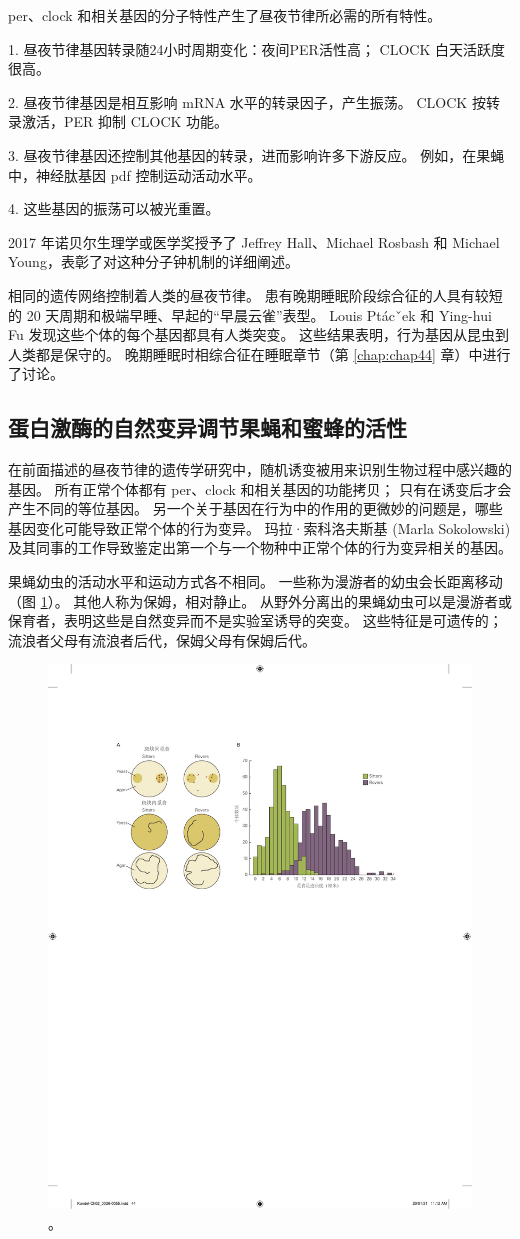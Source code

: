 per、clock 和相关基因的分子特性产生了昼夜节律所必需的所有特性。

1. 昼夜节律基因转录随24小时周期变化：夜间PER活性高； CLOCK 白天活跃度很高。

2. 昼夜节律基因是相互影响 mRNA 水平的转录因子，产生振荡。 CLOCK 按转录激活，PER 抑制 CLOCK 功能。

3. 昼夜节律基因还控制其他基因的转录，进而影响许多下游反应。 例如，在果蝇中，神经肽基因 pdf 控制运动活动水平。

4. 这些基因的振荡可以被光重置。

2017 年诺贝尔生理学或医学奖授予了 Jeffrey Hall、Michael Rosbash 和 Michael Young，表彰了对这种分子钟机制的详细阐述。

相同的遗传网络控制着人类的昼夜节律。 
患有晚期睡眠阶段综合征的人具有较短的 20 天周期和极端早睡、早起的“早晨云雀”表型。 
Louis Ptácˇek 和 Ying-hui Fu 发现这些个体的每个基因都具有人类突变。 
这些结果表明，行为基因从昆虫到人类都是保守的。 
晚期睡眠时相综合征在睡眠章节（第 \ref{chap:chap44} 章）中进行了讨论。


\subsection{蛋白激酶的自然变异调节果蝇和蜜蜂的活性}
在前面描述的昼夜节律的遗传学研究中，随机诱变被用来识别生物过程中感兴趣的基因。 
所有正常个体都有 per、clock 和相关基因的功能拷贝； 只有在诱变后才会产生不同的等位基因。 
另一个关于基因在行为中的作用的更微妙的问题是，哪些基因变化可能导致正常个体的行为变异。 
玛拉·索科洛夫斯基 (Marla Sokolowski) 及其同事的工作导致鉴定出第一个与一个物种中正常个体的行为变异相关的基因。


果蝇幼虫的活动水平和运动方式各不相同。 
一些称为漫游者的幼虫会长距离移动（图 \ref{fig:2_14}）。 
其他人称为保姆，相对静止。 
从野外分离出的果蝇幼虫可以是漫游者或保育者，表明这些是自然变异而不是实验室诱导的突变。 
这些特征是可遗传的； 流浪者父母有流浪者后代，保姆父母有保姆后代。

\begin{figure}[htbp]
	\centering
	\includegraphics[width=0.5\linewidth]{chap02/fig_2_14}
	\caption{。}
	\label{fig:2_14}
\end{figure}


